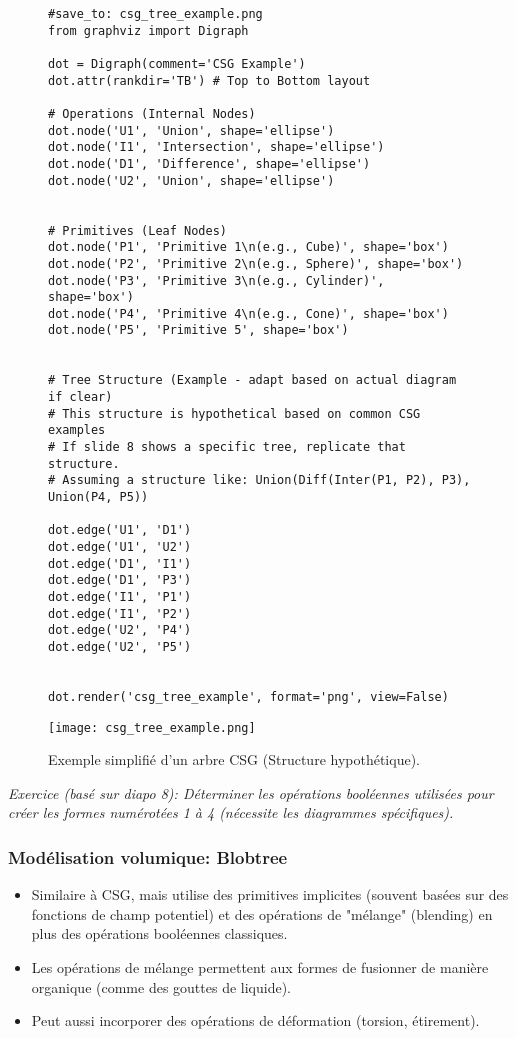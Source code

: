 \documentclass{article}
\begin{document}
\begin{figure}[H]
    \centering
    \begin{verbatim}
#save_to: csg_tree_example.png
from graphviz import Digraph

dot = Digraph(comment='CSG Example')
dot.attr(rankdir='TB') # Top to Bottom layout

# Operations (Internal Nodes)
dot.node('U1', 'Union', shape='ellipse')
dot.node('I1', 'Intersection', shape='ellipse')
dot.node('D1', 'Difference', shape='ellipse')
dot.node('U2', 'Union', shape='ellipse')


# Primitives (Leaf Nodes)
dot.node('P1', 'Primitive 1\n(e.g., Cube)', shape='box')
dot.node('P2', 'Primitive 2\n(e.g., Sphere)', shape='box')
dot.node('P3', 'Primitive 3\n(e.g., Cylinder)', shape='box')
dot.node('P4', 'Primitive 4\n(e.g., Cone)', shape='box')
dot.node('P5', 'Primitive 5', shape='box')


# Tree Structure (Example - adapt based on actual diagram if clear)
# This structure is hypothetical based on common CSG examples
# If slide 8 shows a specific tree, replicate that structure.
# Assuming a structure like: Union(Diff(Inter(P1, P2), P3), Union(P4, P5))

dot.edge('U1', 'D1')
dot.edge('U1', 'U2')
dot.edge('D1', 'I1')
dot.edge('D1', 'P3')
dot.edge('I1', 'P1')
dot.edge('I1', 'P2')
dot.edge('U2', 'P4')
dot.edge('U2', 'P5')


dot.render('csg_tree_example', format='png', view=False)
    \end{verbatim}
    \texttt{[image: csg\_tree\_example.png]}
    \caption{Exemple simplifié d'un arbre CSG (Structure hypothétique).}
    \label{fig:csg_tree_example}
\end{figure}


\textit{Exercice (basé sur diapo 8): Déterminer les opérations booléennes utilisées pour créer les formes numérotées 1 à 4 (nécessite les diagrammes spécifiques).}


\subsubsection{Modélisation volumique: Blobtree}

\begin{itemize}
    \item Similaire à CSG, mais utilise des primitives implicites (souvent basées sur des fonctions de champ potentiel) et des opérations de "mélange" (blending) en plus des opérations booléennes classiques.
    \item Les opérations de mélange permettent aux formes de fusionner de manière organique (comme des gouttes de liquide).
    \item Peut aussi incorporer des opérations de déformation (torsion, étirement).
\end{itemize}
\end{document}
